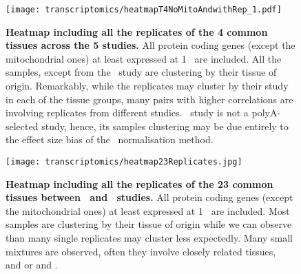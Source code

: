 \begin{figure}[htpb]
    \texttt{[image: transcriptomics/heatmapT4NoMitoAndwithRep\_1.pdf]}\centering
    \caption[Heatmap including all the replicates of the 4 common tissues
    across the 5 studies]{\label{fig:noMitoRep4T}\textbf{Heatmap including all
    the replicates of the 4 common tissues across the 5 studies.} All protein
    coding genes (except the mitochondrial ones)
    at least expressed at 1 \FPKM\ are included. All the samples, except from the
    \castle\ study are clustering by their tissue of origin.
    Remarkably, while the replicates may cluster by their study in each of the
    tissue groups, many pairs with higher correlations are involving replicates
    from different studies. \castle\ study is not a polyA-selected study, hence,
    its samples clustering may be due entirely to the effect size bias of the
    \FPKM\ normalisation method.}
\end{figure}

\begin{figure}[htpb]
    \texttt{[image: transcriptomics/heatmap23Replicates.jpg]}\centering
    \caption[Heatmap including all the replicates of the 23 common tissues
    between Uhlén and GTEx studies]{\label{fig:noMitoRep23T}\textbf{Heatmap
    including all the replicates of the 23 common tissues between \uhlen\ and
    \gtex\ studies.} All protein coding genes (except the mitochondrial ones)
    at least expressed at 1 \FPKM\ are included. Most samples are clustering by
    their tissue of origin while we can observe than many single replicates may
    cluster less expectedly. Many small mixtures are observed, often they involve
    closely related tissues, \ie\  and  or
     and .}
\end{figure}



